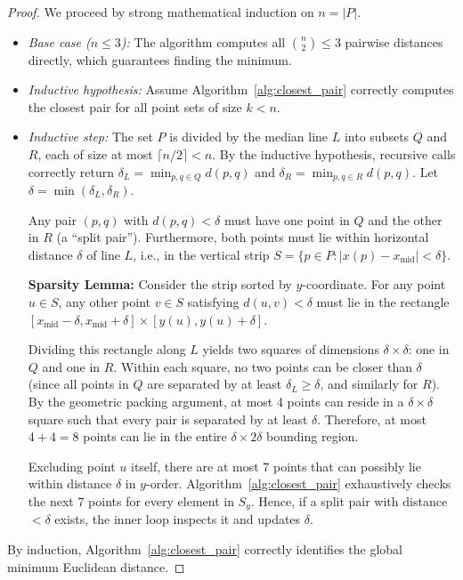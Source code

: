 \begin{proof}
We proceed by strong mathematical induction on $n = |P|$.
\begin{itemize}
    \item \textit{Base case ($n \le 3$):} The algorithm computes all $\binom{n}{2} \le 3$ pairwise distances directly, which guarantees finding the minimum.
    \item \textit{Inductive hypothesis:} Assume Algorithm~\ref{alg:closest_pair} correctly computes the closest pair for all point sets of size $k < n$.
    \item \textit{Inductive step:} The set $P$ is divided by the median line $L$ into subsets $Q$ and $R$, each of size at most $\lceil n/2 \rceil < n$. By the inductive hypothesis, recursive calls correctly return $\delta_L = \min_{p,q \in Q} d(p,q)$ and $\delta_R = \min_{p,q \in R} d(p,q)$. Let $\delta = \min(\delta_L, \delta_R)$. 
    
    Any pair $(p, q)$ with $d(p, q) < \delta$ must have one point in $Q$ and the other in $R$ (a ``split pair''). Furthermore, both points must lie within horizontal distance $\delta$ of line $L$, i.e., in the vertical strip $S = \{p \in P : |x(p) - x_{\text{mid}}| < \delta\}$.
    
    \textbf{Sparsity Lemma:} Consider the strip sorted by $y$-coordinate. For any point $u \in S$, any other point $v \in S$ satisfying $d(u, v) < \delta$ must lie in the rectangle $[x_{\text{mid}}-\delta, x_{\text{mid}}+\delta] \times [y(u), y(u)+\delta]$.
    
    Dividing this rectangle along $L$ yields two squares of dimensions $\delta \times \delta$: one in $Q$ and one in $R$. Within each square, no two points can be closer than $\delta$ (since all points in $Q$ are separated by at least $\delta_L \ge \delta$, and similarly for $R$). By the geometric packing argument, at most 4 points can reside in a $\delta \times \delta$ square such that every pair is separated by at least $\delta$. Therefore, at most $4 + 4 = 8$ points can lie in the entire $\delta \times 2\delta$ bounding region.
    
    Excluding point $u$ itself, there are at most 7 points that can possibly lie within distance $\delta$ in $y$-order. Algorithm~\ref{alg:closest_pair} exhaustively checks the next 7 points for every element in $S_y$. Hence, if a split pair with distance $< \delta$ exists, the inner loop inspects it and updates $\delta$.
\end{itemize}
By induction, Algorithm~\ref{alg:closest_pair} correctly identifies the global minimum Euclidean distance.
\end{proof}


